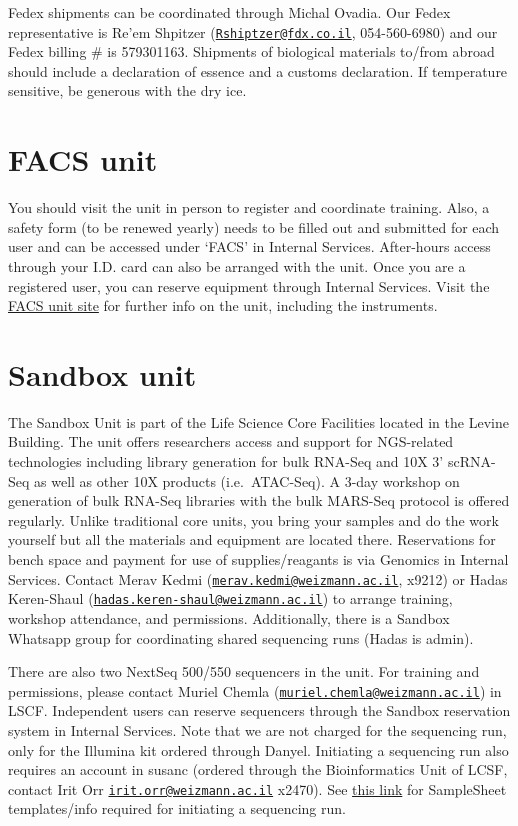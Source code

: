 \documentclass[]{book}
\begin{document}
Fedex shipments can be coordinated through Michal Ovadia. Our Fedex
representative is Re'em Shpitzer
(\href{mailto:Rshiptzer@fdx.co.il}{\nolinkurl{Rshiptzer@fdx.co.il}},
054-560-6980) and our Fedex billing \# is 579301163. Shipments of
biological materials to/from abroad should include a declaration of
essence and a customs declaration. If temperature sensitive, be generous
with the dry ice.

\section{FACS unit}\label{facs-unit}

You should visit the unit in person to register and coordinate training.
Also, a safety form (to be renewed yearly) needs to be filled out and
submitted for each user and can be accessed under `FACS' in Internal
Services. After-hours access through your I.D. card can also be arranged
with the unit. Once you are a registered user, you can reserve equipment
through Internal Services. Visit the
\href{https://www.weizmann.ac.il/LS_CoreFacilities/flow-cytometry/about}{FACS
unit site} for further info on the unit, including the instruments.

\section{Sandbox unit}\label{sandbox-unit}

The Sandbox Unit is part of the Life Science Core Facilities located in
the Levine Building. The unit offers researchers access and support for
NGS-related technologies including library generation for bulk RNA-Seq
and 10X 3' scRNA-Seq as well as other 10X products (i.e.~ATAC-Seq). A
3-day workshop on generation of bulk RNA-Seq libraries with the bulk
MARS-Seq protocol is offered regularly. Unlike traditional core units,
you bring your samples and do the work yourself but all the materials
and equipment are located there. Reservations for bench space and
payment for use of supplies/reagants is via Genomics in Internal
Services. Contact Merav Kedmi
(\href{mailto:merav.kedmi@weizmann.ac.il}{\nolinkurl{merav.kedmi@weizmann.ac.il}},
x9212) or Hadas Keren-Shaul
(\href{mailto:hadas.keren-shaul@weizmann.ac.il}{\nolinkurl{hadas.keren-shaul@weizmann.ac.il}})
to arrange training, workshop attendance, and permissions. Additionally,
there is a Sandbox Whatsapp group for coordinating shared sequencing
runs (Hadas is admin).

There are also two NextSeq 500/550 sequencers in the unit. For training
and permissions, please contact Muriel Chemla
(\href{mailto:muriel.chemla@weizmann.ac.il}{\nolinkurl{muriel.chemla@weizmann.ac.il}})
in LSCF. Independent users can reserve sequencers through the Sandbox
reservation system in Internal Services. Note that we are not charged
for the sequencing run, only for the Illumina kit ordered through
Danyel. Initiating a sequencing run also requires an account in susanc
(ordered through the Bioinformatics Unit of LCSF, contact Irit Orr
\href{mailto:irit.orr@weizmann.ac.il}{\nolinkurl{irit.orr@weizmann.ac.il}}
x2470). See
\href{https://susanc.weizmann.ac.il/static/doc//howto.html}{this link}
for SampleSheet templates/info required for initiating a sequencing run.
\end{document}
